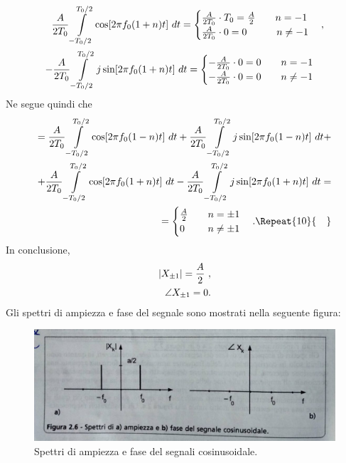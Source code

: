 \documentclass[12pt,oneside,openany]{memoir}
\numberwithin{equation}{subsection}
\DeclarePairedDelimiter{\abs}{\lvert}{\rvert}
\newcommand{\quads}[1]{\Repeat{#1}{\quad}}
\newcommand{\dt}{\ dt}
\begin{document}
\begin{equation}
	\begin{split}
		\frac{A}{2 T_0} \int\displaylimits_{-T_0/2}^{T_0/2} \cos[2 \pi f_0 (1 + n) t] \dt =
			\begin{cases}
				\frac{A}{2 T_0} \cdot T_0 = \frac{A}{2} \quad\quad n = -1\\
				\frac{A}{2 T_0} \cdot 0 = 0 \quad\quad \ \ \ n \neq -1
			\end{cases},
		\\
		-\frac{A}{2 T_0} \int\displaylimits_{-T_0/2}^{T_0/2} j \sin[2 \pi f_0 (1 + n) t] \dt =
			\begin{cases}
				-\frac{A}{2 T_0} \cdot 0 = 0 \quad\quad n = -1\\
				-\frac{A}{2 T_0} \cdot 0 = 0 \quad\quad n \neq -1
			\end{cases}
	\end{split}
\end{equation}
Ne segue quindi che
\begin{equation}
	\begin{split}
		= \frac{A}{2 T_0} \int\displaylimits_{-T_0/2}^{T_0/2} \cos[2 \pi f_0 (1 - n) t] \dt + \frac{A}{2 T_0} \int\displaylimits_{-T_0/2}^{T_0/2} j \sin[2 \pi f_0 (1 - n) t] \dt +
		\\
		+ \frac{A}{2 T_0} \int\displaylimits_{-T_0/2}^{T_0/2} \cos[2 \pi f_0 (1 + n) t] \dt - \frac{A}{2 T_0} \int\displaylimits_{-T_0/2}^{T_0/2} j \sin[2 \pi f_0 (1 + n) t] \dt =
		\\
		=
		\begin{cases}
			\frac{A}{2} \quad\quad n = \pm 1\\
			0 \quad\quad \ n \neq \pm 1
		\end{cases}.
		\quads{10}
	\end{split}
\end{equation}
In conclusione,
\begin{equation}
	\begin{split}
		\abs{X_{\pm 1}} = \frac{A}{2} \ ,\\
		\angle X_{\pm 1} = 0.
	\end{split}
\end{equation}
Gli spettri di ampiezza e fase del segnale sono mostrati nella seguente figura:
\begin{figure}[H]
\centering
\captionsetup{justification=centering}
\includegraphics[width=1.0\textwidth]{images/cosine_power_phase_spectrum.jpg}
\caption{Spettri di ampiezza e fase del segnali cosinusoidale.}
\end{figure}
\end{document}
